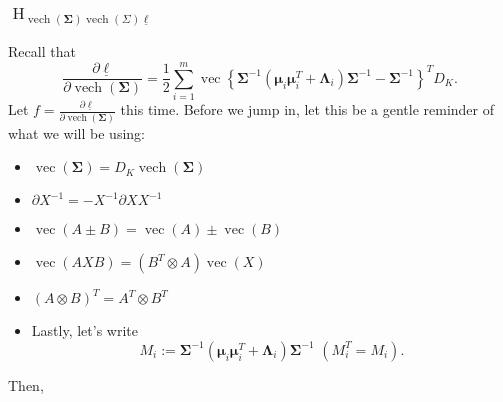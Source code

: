 \documentclass[11pt]{article}
\newcommand{\bs}{\boldsymbol}
\newcommand{\opn}{\operatorname}
\begin{document}
\subsubsection{$\opn{H}_{\opn{vech}\left(\bs{\Sigma} \right)\opn{vech}\left(\Sigma \right)\underline{\ell} } $}
Recall that
$$
  \frac{\partial \underline{\ell}}{\partial \opn{vech}\left(\bs{\Sigma} \right) } = \frac{1}{2}\sum_{i=1}^{m} \opn{vec}\left\{\bs{\Sigma}^{-1} \left(\bs{\mu}_{i}\bs{\mu}_{i}^{T} + \bs{\Lambda}_{i} \right)\bs{\Sigma}^{-1} - \bs{\Sigma}^{-1} \right\}^{T}D_{K}.
$$
Let $f = \frac{\partial \underline{\ell}}{\partial \opn{vech}\left(\bs{\Sigma} \right) }$ this time.
Before we jump in, let this be a gentle reminder of what we will be using:
\begin{itemize}
  \item $\opn{vec}\left(\bs{\Sigma} \right) = D_{K}\opn{vech}\left(\bs{\Sigma} \right)$
  \item $\partial X^{-1} = -X^{-1}\partial X X^{-1} $
  \item $\opn{vec}\left(A \pm B \right) = \opn{vec}\left(A \right) \pm \opn{vec}\left( B \right) $
  \item $\opn{vec}\left(AXB \right) = \left(B^{T} \otimes A \right) \opn{vec}\left(X \right)$
  \item $\left(A \otimes B \right)^{T} = A^{T} \otimes B^{T} $
  \item Lastly, let's write
  $$
    M_{i} := \bs{\Sigma}^{-1}\left(\bs{\mu}_{i}\bs{\mu}_{i}^{T} + \bs{\Lambda}_{i} \right)\bs{\Sigma}^{-1} \,\, \left(M_{i}^{T} = M_{i} \right).
  $$
\end{itemize}
Then,
\end{document}
